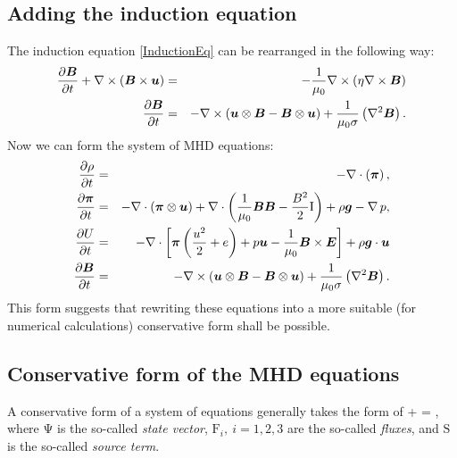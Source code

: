 \subsection{Adding the induction equation}
The induction equation \ref{InductionEq} can be rearranged in the following way:
\begin{eqnarray}
\frac{\partial{\mbox{\boldmath $B$}}}{\partial{t}} + \nabla \times \left( \mbox{\boldmath $B$} \times \mbox{\boldmath $u$} \right) & = & -\frac{1}{\mu_0} \nabla \times \left( \eta \nabla \times \mbox{\boldmath $B$} \right)\\
\label{InductionPreFinal} \frac{\partial{\mbox{\boldmath $B$}}}{\partial{t}} & = & - \nabla \times \left( \mbox{\boldmath $u$} \otimes \mbox{\boldmath $B$} - \mbox{\boldmath $B$} \otimes \mbox{\boldmath $u$} \right) + \frac{1}{\mu_{0}\sigma} \left( \nabla^2 \mbox{\boldmath $B$} \right).
\end{eqnarray}
Now we can form the system of MHD equations:
\begin{eqnarray}
\label{ContinuityEqFinal} \frac{\partial{\rho}}{\partial{t}} & = & - \nabla\cdot\left(\mbox{\boldmath $\pi$}\right),\\
\label{NSEqFinal} \frac{\partial{\mbox{\boldmath $\pi$}}}{\partial{t}} & = & - \nabla\cdot\left(\mbox{\boldmath $\pi$}\otimes\mbox{\boldmath $u$}\right) + \nabla\cdot\left(\frac{1}{\mu_0}\mbox{\boldmath $B$}\mbox{\boldmath $B$} - \frac{B^2}{2}\mathrm{I}\right) + \rho\mbox{\boldmath $g$} - \nabla\,p,\\
\label{EnergyEqFinal} \frac{\partial{U}}{\partial{t}} & = & -\nabla\cdot\left[\mbox{\boldmath $\pi$}\left( \frac{u^2}{2} + e\right) + p \mbox{\boldmath $u$} - \frac{1}{\mu_0}\mbox{\boldmath $B$}\times\mbox{\boldmath $E$}\right] + \rho \mbox{\boldmath $g$} \cdot \mbox{\boldmath $u$}\\
\label{InductionFinal} \frac{\partial{\mbox{\boldmath $B$}}}{\partial{t}} & = & - \nabla \times \left( \mbox{\boldmath $u$} \otimes \mbox{\boldmath $B$} - \mbox{\boldmath $B$} \otimes \mbox{\boldmath $u$} \right) + \frac{1}{\mu_{0}\sigma} \left( \nabla^2 \mbox{\boldmath $B$} \right).
\end{eqnarray}
This form suggests that rewriting these equations into a more suitable (for numerical calculations) conservative form shall be possible.
\subsection{Conservative form of the MHD equations}
A conservative form of a system of equations generally takes the form of
\be
\label{conservativeGeneric}  + \nabla \cdot {}\lo\mathrm{\Psi}\ro = ,
\ee
where $\mathrm{\Psi}$ is the so-called \textit{state vector}, $\mathrm{F}_i,\ i = 1, 2, 3$ are the so-called \textit{fluxes}, and $\mathrm{S}$ is the so-called \textit{source term}.
